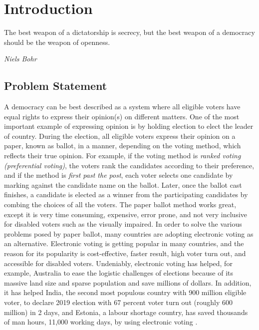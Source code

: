 \chapter{Introduction}
\label{cha:intro}
\epigraph{The best weapon of a dictatorship is secrecy, but the best weapon of a democracy should be the weapon of openness.} 
{\textit{Niels Bohr}} 

\section{Problem Statement}
A democracy can be best described as a system where all eligible voters have equal rights to express their opinion(s) on different matters. 
One of the most important example of expressing opinion is by holding election to elect the leader of country. During the 
election, all eligible voters express their opinion on a paper,  known as ballot,  in a manner, depending on the voting method, 
which reflects their true opinion.  For example, if the voting method is \textit{ranked voting (preferential voting)},  the voters rank the 
candidates according to their preference, and if the method is \textit{first past the post},  each voter selects one candidate by marking
against the candidate name on the ballot. Later, once the ballot cast finishes, a candidate is elected as a winner from  the participating
candidates by combing the choices of all the voters. 
The paper ballot method works great, except it is very time consuming, expensive, error prone, 
and not very inclusive for disabled voters such as the visually impaired.
In order to solve the various problems posed by paper ballot, many countries are adopting electronic voting as an alternative. 
Electronic voting is 
getting popular in many countries, and the reason for its popularity is cost-effective, faster result, high voter turn out, 
and accessible for disabled voters.  
Undeniably, electronic voting has helped, for example, Australia to ease the logistic challenges of elections because of its massive land size and sparse
population and save millions of dollars.  In addition, it has helped India, the second most populous country with 900 million eligible voter, to declare 
2019 election with 67 percent voter turn out (roughly 600 million) in 2 days, and  Estonia, a labour shortage country, has saved 
thousands of man hours, 11,000 working days, by using electronic voting \citep{Estonia}.

